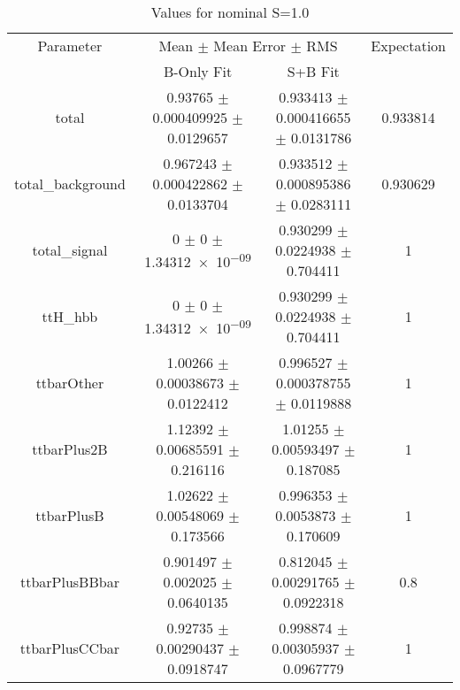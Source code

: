 \begin{table}
\centering
\caption{Values for nominal S=1.0}
\begin{tabular}{cccc}
\toprule
Parameter & \multicolumn{2}{c}{Mean $\pm$ Mean Error $\pm$ RMS} & Expectation\\
 & B-Only Fit & S+B Fit & \\
\midrule
total & \num{0.93765} $\pm$ \num{0.000409925} $\pm$ \num{0.0129657} & \num{0.933413} $\pm$ \num{0.000416655} $\pm$ \num{0.0131786} & \num{0.933814}\\
total\_background & \num{0.967243} $\pm$ \num{0.000422862} $\pm$ \num{0.0133704} & \num{0.933512} $\pm$ \num{0.000895386} $\pm$ \num{0.0283111} & \num{0.930629}\\
total\_signal & \num{0} $\pm$ \num{0} $\pm$ \num{1.34312e-09} & \num{0.930299} $\pm$ \num{0.0224938} $\pm$ \num{0.704411} & \num{1}\\
ttH\_hbb & \num{0} $\pm$ \num{0} $\pm$ \num{1.34312e-09} & \num{0.930299} $\pm$ \num{0.0224938} $\pm$ \num{0.704411} & \num{1}\\
ttbarOther & \num{1.00266} $\pm$ \num{0.00038673} $\pm$ \num{0.0122412} & \num{0.996527} $\pm$ \num{0.000378755} $\pm$ \num{0.0119888} & \num{1}\\
ttbarPlus2B & \num{1.12392} $\pm$ \num{0.00685591} $\pm$ \num{0.216116} & \num{1.01255} $\pm$ \num{0.00593497} $\pm$ \num{0.187085} & \num{1}\\
ttbarPlusB & \num{1.02622} $\pm$ \num{0.00548069} $\pm$ \num{0.173566} & \num{0.996353} $\pm$ \num{0.0053873} $\pm$ \num{0.170609} & \num{1}\\
ttbarPlusBBbar & \num{0.901497} $\pm$ \num{0.002025} $\pm$ \num{0.0640135} & \num{0.812045} $\pm$ \num{0.00291765} $\pm$ \num{0.0922318} & \num{0.8}\\
ttbarPlusCCbar & \num{0.92735} $\pm$ \num{0.00290437} $\pm$ \num{0.0918747} & \num{0.998874} $\pm$ \num{0.00305937} $\pm$ \num{0.0967779} & \num{1}\\
\bottomrule
\end{tabular}
\end{table}